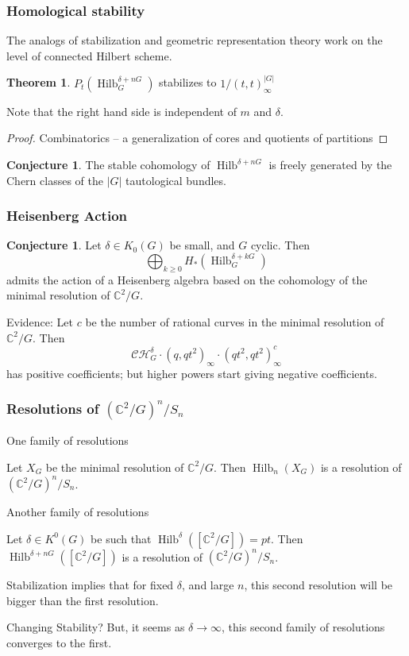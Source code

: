 \documentclass{amsart}[12pt]
\theoremstyle{definition}
\newtheorem{theorem}[dummy]{Theorem}
\newtheorem{conjecture}[dummy]{Conjecture}
\newcommand{\C}{\mathbb{C}}
\DeclareMathOperator{\Hilb}{Hilb}
\begin{document}
\subsubsection{Homological stability}

The analogs of stabilization and geometric representation theory work on the level of connected Hilbert scheme.

\begin{theorem} 
$P_t(\Hilb^{\delta+nG}_G)$ stabilizes to $1/(t,t)_\infty^{|G|}$
\end{theorem}
Note that the right hand side is independent of $m$ and $\delta$.
\begin{proof} Combinatorics -- a generalization of cores and quotients of partitions \end{proof}

\begin{conjecture}
The stable cohomology of $\Hilb^{\delta+nG}$ is freely generated by the Chern classes of the $|G|$ tautological bundles.
\end{conjecture}



\subsubsection{Heisenberg Action}


\begin{conjecture}
Let $\delta\in K_0(G)$ be small, and $G$ cyclic.  Then
$$\bigoplus_{k\geq 0} H_*(\Hilb^{\delta+kG}_G)$$ admits the action of a Heisenberg algebra based on the cohomology of the minimal resolution of $\C^2/G$.
\end{conjecture}

Evidence:
Let $c$ be the number of rational curves in the minimal resolution of $\C^2/G$.  Then
$$\mathcal{CH}^\delta_G\cdot(q,qt^2)_\infty\cdot (qt^2,qt^2)_\infty^c$$
has positive coefficients; but higher powers start giving negative coefficients.


\subsubsection{Resolutions of $(\C^2/G)^n/S_n$}
One family of resolutions

Let $X_G$ be the minimal resolution of $\C^2/G$.  Then $\Hilb_n(X_G)$ is a resolution of $(\C^2/G)^n/S_n$.


Another family of resolutions

Let $\delta\in K^0(G)$ be such that $\Hilb^\delta([\C^2/G])=pt$.  Then $\Hilb^{\delta+nG}([\C^2/G])$ is a resolution of $(\C^2/G)^n/S_n$.  



Stabilization implies that for fixed $\delta$, and large $n$, this second resolution will be bigger than the first resolution.

Changing Stability?
But, it seems as $\delta\to\infty$, this second family of resolutions converges to the first.





\end{document}
